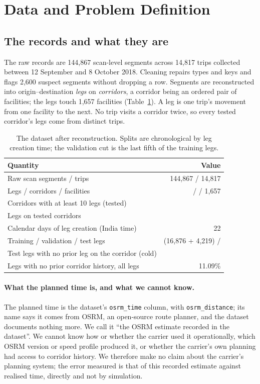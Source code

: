 \section{Data and Problem Definition}\label{sec:data}

\subsection{The records and what they are}
The raw records are 144,867 scan-level segments across 14,817 trips collected between 12 September and 8 October 2018. Cleaning repairs types and keys and flags 2,600 suspect segments without dropping a row. Segments are reconstructed into \fzLegsTotal{} origin--destination \emph{legs} on \fzCorridorsTotal{} \emph{corridors}, a corridor being an ordered pair of facilities; the legs touch 1,657 facilities (Table~\ref{tab:dataset}). A leg is one trip's movement from one facility to the next. No trip visits a corridor twice, so every tested corridor's legs come from distinct trips.

\begin{table}[t]
\caption{The dataset after reconstruction. Splits are chronological by leg creation time; the validation cut is the last fifth of the training legs.}
\label{tab:dataset}
\centering
\begin{tabular}{@{}lr@{}}
\toprule
Quantity & Value \\
\midrule
Raw scan segments / trips & 144,867 / 14,817 \\
Legs / corridors / facilities & \fzLegsTotal{} / \fzCorridorsTotal{} / 1,657 \\
Corridors with at least 10 legs (tested) & \fzCorridorsTested{} \\
Legs on tested corridors & \fzLegsCovered{} \\
Calendar days of leg creation (India time) & 22 \\
Training / validation / test legs & \fzSplitTrain{} (16,876 + 4,219) / \fzSplitTest{} \\
Test legs with no prior leg on the corridor (cold) & \fzColdLegsTest{} \\
Legs with no prior corridor history, all legs & 11.09\% \\
\bottomrule
\end{tabular}
\end{table}

\paragraph{What the planned time is, and what we cannot know.} The planned time is the dataset's \texttt{osrm\_time} column, with \texttt{osrm\_distance}; its name says it comes from OSRM, an open-source route planner, and the dataset documents nothing more. We call it ``the OSRM estimate recorded in the dataset''. We cannot know how or whether the carrier used it operationally, which OSRM version or speed profile produced it, or whether the carrier's own planning had access to corridor history. We therefore make no claim about the carrier's planning system; the error measured is that of this recorded estimate against realised time, directly and not by simulation.

